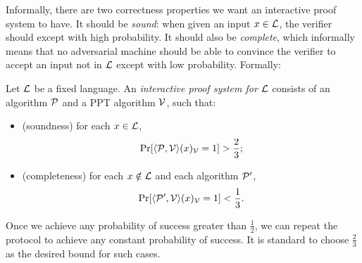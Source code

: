 Informally, there are two correctness properties we want an interactive proof
system to have. It should be \emph{sound}: when given an input $x\in\mathcal{L}$, the
verifier should except with high probability. It should also be \emph{complete},
which informally means that no adversarial machine should be able to convince
the verifier to accept an input not in $\mathcal{L}$ except with low probability.
Formally:
\begin{dfn}
  Let $\mathcal{L}$ be a fixed language. An \emph{interactive proof system for $\mathcal{L}$}
  consists of an algorithm $\mathcal{P}$ and a PPT algorithm $\mathcal{V}$, such that:
  \begin{itemize}
    \item (soundness) for each $x\in\mathcal{L}$, \[
        \Pr[\langle\mathcal{P},\mathcal{V}\rangle(x)_{\mathcal{V}} = 1] > \frac{2}{3};
      \]
    \item (completeness) for each $x\notin\mathcal{L}$ and each algorithm $\mathcal{P}'$, \[
        \Pr[\langle\mathcal{P}',\mathcal{V}\rangle(x)_{\mathcal{V}} = 1] < \frac{1}{3}.
      \]
  \end{itemize}
\end{dfn}
Once we achieve any probability of success greater than $\frac{1}{2}$, we can
repeat the protocol to achieve any constant probability of success. It is
standard to choose $\frac{2}{3}$ as the desired bound for such cases.

